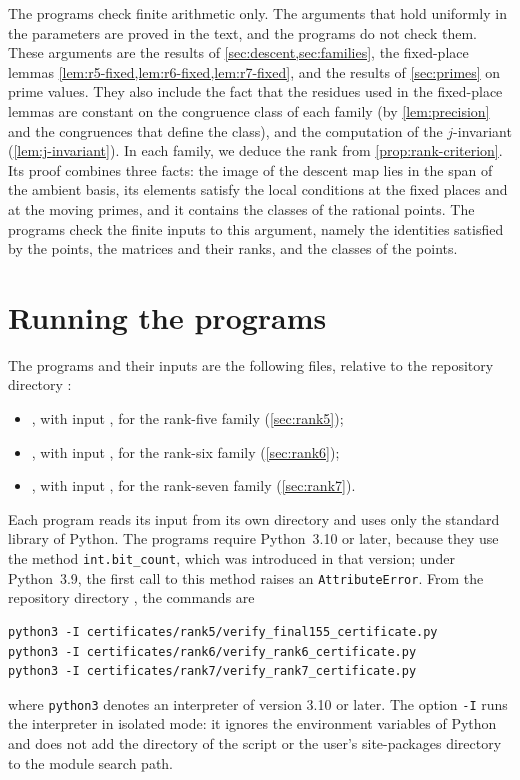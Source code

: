 \documentclass[12pt,oneside,openany]{book}
\theoremstyle{definition}
\theoremstyle{plain}
\numberwithin{equation}{chapter}
\theoremstyle{plain}
\theoremstyle{definition}
\theoremstyle{remark}
\begin{document}
The programs check finite arithmetic only. The arguments that hold uniformly in the parameters are proved in the text, and the programs do not check them. These arguments are the results of \cref{sec:descent,sec:families}, the fixed-place lemmas \cref{lem:r5-fixed,lem:r6-fixed,lem:r7-fixed}, and the results of \cref{sec:primes} on prime values. They also include the fact that the residues used in the fixed-place lemmas are constant on the congruence class of each family (by \cref{lem:precision} and the congruences that define the class), and the computation of the $j$-invariant (\cref{lem:j-invariant}). In each family, we deduce the rank from \cref{prop:rank-criterion}. Its proof combines three facts: the image of the descent map lies in the span of the ambient basis, its elements satisfy the local conditions at the fixed places and at the moving primes, and it contains the classes of the rational points. The programs check the finite inputs to this argument, namely the identities satisfied by the points, the matrices and their ranks, and the classes of the points.

\section{Running the programs}\label{sec:verification-running}

The programs and their inputs are the following files, relative to the repository
directory :
\begin{itemize}
\item {}, with input , for the rank-five family (\cref{sec:rank5});
\item {}, with input , for the rank-six family (\cref{sec:rank6});
\item {}, with input , for the rank-seven family (\cref{sec:rank7}).
\end{itemize}
Each program reads its input from its own directory and uses only the standard library of Python. The programs require Python~3.10 or later, because they use the method \texttt{int.bit\_count}, which was introduced in that version; under Python~3.9, the first call to this method raises an \texttt{AttributeError}. From the repository directory , the commands are
\begin{verbatim}
python3 -I certificates/rank5/verify_final155_certificate.py
python3 -I certificates/rank6/verify_rank6_certificate.py
python3 -I certificates/rank7/verify_rank7_certificate.py
\end{verbatim}
where \texttt{python3} denotes an interpreter of version 3.10 or later. The option \texttt{-I} runs the interpreter in isolated mode: it ignores the environment variables of Python and does not add the directory of the script or the user's site-packages directory to the module search path.
\end{document}
